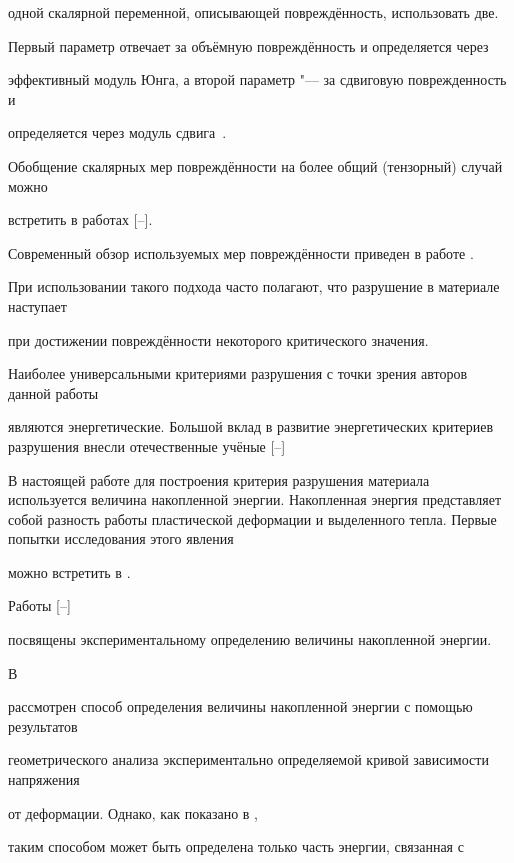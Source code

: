 одной скалярной переменной, описывающей повреждённость, использовать две.

Первый параметр отвечает за объёмную повреждённость и определяется через

эффективный модуль Юнга, а второй параметр "--- за сдвиговую поврежденность и

определяется через модуль сдвига~\cite{kostina:bib:TangSheng}.

Обобщение скалярных мер повреждённости на более общий (тензорный) случай можно

встретить в работах [--].

Современный обзор используемых мер повреждённости приведен в работе \cite{kostina:bib:StepIgonin}.

При использовании такого подхода часто полагают, что разрушение в материале наступает

при достижении повреждённости некоторого критического значения.



Наиболее универсальными критериями разрушения с точки зрения авторов данной работы

являются энергетические. Большой вклад в развитие энергетических критериев разрушения внесли отечественные учёные [--]

В настоящей работе для построения критерия разрушения материала используется величина накопленной энергии. Накопленная энергия представляет собой разность работы пластической деформации и выделенного тепла. Первые попытки исследования этого явления

можно встретить в \cite{kostina:bib:FarrenTaylor,kostina:bib:TaylorQuin}.

Работы  [--]

посвящены экспериментальному определению величины накопленной энергии.

В \cite{kostina:bib:AravasKim}

рассмотрен способ определения величины накопленной энергии с помощью результатов

геометрического анализа экспериментально определяемой кривой зависимости напряжения

от деформации. Однако, как показано в  \cite{kostina:bib:OliferukMaj},

таким способом может быть определена только часть энергии, связанная с

